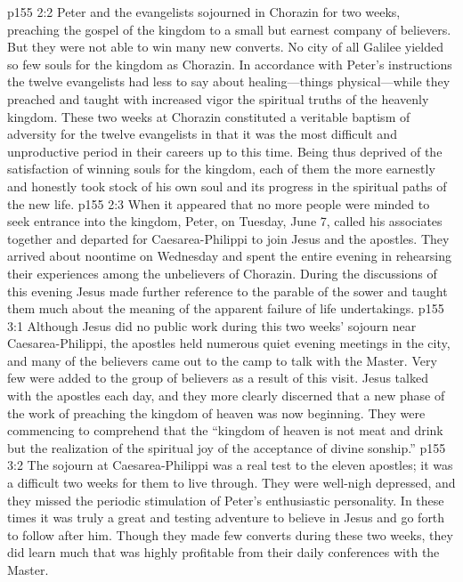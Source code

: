 \vs p155 2:2 Peter and the evangelists sojourned in Chorazin for two weeks, preaching the gospel of the kingdom to a small but earnest company of believers. But they were not able to win many new converts. No city of all Galilee yielded so few souls for the kingdom as Chorazin. In accordance with Peter’s instructions the twelve evangelists had less to say about healing---things physical---while they preached and taught with increased vigor the spiritual truths of the heavenly kingdom. These two weeks at Chorazin constituted a veritable baptism of adversity for the twelve evangelists in that it was the most difficult and unproductive period in their careers up to this time. Being thus deprived of the satisfaction of winning souls for the kingdom, each of them the more earnestly and honestly took stock of his own soul and its progress in the spiritual paths of the new life.\plusone
\vs p155 2:3 When it appeared that no more people were minded to seek entrance into the kingdom, Peter, on Tuesday, June 7, called his associates together and departed for Caesarea\hyp{}Philippi to join Jesus and the apostles. They arrived about noontime on Wednesday and spent the entire evening in rehearsing their experiences among the unbelievers of Chorazin. During the discussions of this evening Jesus made further reference to the parable of the sower and taught them much about the meaning of the apparent failure of life undertakings.
\vs p155 3:1 Although Jesus did no public work during this two weeks’ sojourn near Caesarea\hyp{}Philippi, the apostles held numerous quiet evening meetings in the city, and many of the believers came out to the camp to talk with the Master. Very few were added to the group of believers as a result of this visit. Jesus talked with the apostles each day, and they more clearly discerned that a new phase of the work of preaching the kingdom of heaven was now beginning. They were commencing to comprehend that the “kingdom of heaven is not meat and drink but the realization of the spiritual joy of the acceptance of divine sonship.”
\vs p155 3:2 The sojourn at Caesarea\hyp{}Philippi was a real test to the eleven apostles; it was a difficult two weeks for them to live through. They were well\hyp{}nigh depressed, and they missed the periodic stimulation of Peter’s enthusiastic personality. In these times it was truly a great and testing adventure to believe in Jesus and go forth to follow after him. Though they made few converts during these two weeks, they did learn much that was highly profitable from their daily conferences with the Master.
